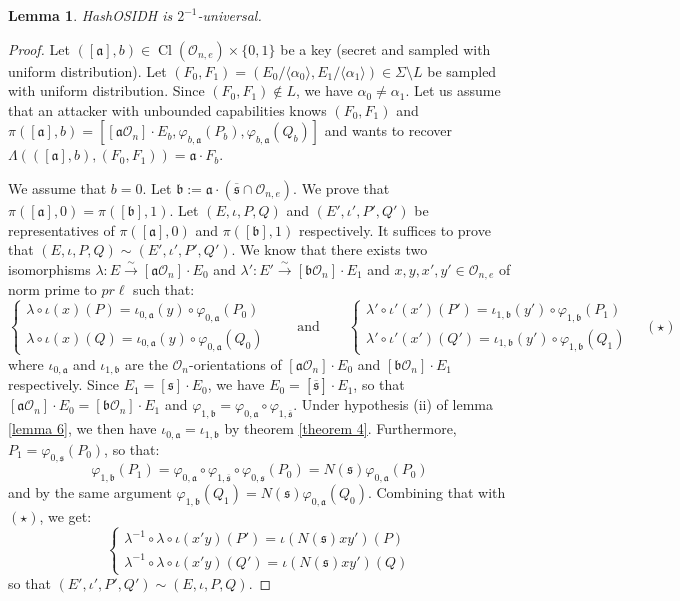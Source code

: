 \documentclass[a4paper,10pt]{report}
\theoremstyle{definition}
\theoremstyle{plain}
\newtheorem{lemma}[definition]{Lemma}
\theoremstyle{definition}
\newcommand{\mO}{\mathcal{O}}
\renewcommand{\(}{\left(}
\renewcommand{\)}{\right)}
\newcommand{\mf}[1]{\mathfrak{#1}}
\DeclareMathOperator{\Cl}{Cl}
\begin{document}
\begin{lemma}
HashOSIDH is $2^{-1}$-universal.
\end{lemma}

\begin{proof}
Let $([\mf{a}],b)\in \Cl(\mO_{n,e})\times\{0,1\}$ be a key (secret and sampled with uniform distribution). Let $(F_0,F_1)=(E_0/\langle\alpha_0\rangle, E_1/\langle\alpha_1\rangle)\in \Sigma\setminus L$ be sampled with uniform distribution.  Since $(F_0,F_1)\not\in L$, we have $\alpha_0\neq\alpha_1$. Let us assume that an attacker with unbounded capabilities knows $(F_0,F_1)$ and $\pi([\mf{a}],b)=[[\mf{a}\mO_n]\cdot E_b, \varphi_{b,\mf{a}}(P_b),\varphi_{b,\mf{a}}(Q_b)]$ and wants to recover $\Lambda(([\mf{a}],b),(F_0,F_1))=\mf{a}\cdot F_b$.  

We assume that $b=0$. Let $\mf{b}:=\mf{a}\cdot (\overline{\mf{s}}\cap\mO_{n,e})$. We prove that $\pi([\mf{a}],0)=\pi([\mf{b}],1)$. Let $(E,\iota, P,Q)$ and $(E',\iota',P',Q')$ be representatives of $\pi([\mf{a}],0)$ and $\pi([\mf{b}],1)$ respectively. It suffices to prove that $(E,\iota, P,Q)\sim(E',\iota',P',Q')$.  We know that there exists two isomorphisms $\lambda : E\overset{\sim}{\longrightarrow} [\mf{a}\mO_n]\cdot E_0$ and $\lambda' : E'\overset{\sim}{\longrightarrow} [\mf{b}\mO_n]\cdot E_1$ and $x, y, x',y'\in\mO_{n,e}$ of norm prime to $pr\ell$ such that:
\[\left\{\begin{array}{c}
\lambda\circ\iota(x)(P)=\iota_{0,\mf{a}}(y)\circ\varphi_{0,\mf{a}}(P_0)\\
\lambda\circ\iota(x)(Q)=\iota_{0,\mf{a}}(y)\circ\varphi_{0,\mf{a}}(Q_0)
\end{array}\right.\qquad \mbox{and}\qquad \left\{\begin{array}{c}
\lambda'\circ\iota'(x')(P')=\iota_{1,\mf{b}}(y')\circ\varphi_{1,\mf{b}}(P_1)\\
\lambda'\circ\iota'(x')(Q')=\iota_{1,\mf{b}}(y')\circ\varphi_{1,\mf{b}}(Q_1)
\end{array}\right.\quad (\star)\]
where $\iota_{0,\mf{a}}$ and $\iota_{1,\mf{b}}$ are the $\mO_n$-orientations of $[\mf{a}\mO_n]\cdot E_0$ and $[\mf{b}\mO_n]\cdot E_1$ respectively. Since $E_1=[\mf{s}]\cdot E_0$, we have $E_0=[\overline{\mf{s}}]\cdot E_1$, so that $[\mf{a}\mO_n]\cdot E_0=[\mf{b}\mO_n]\cdot E_1$ and $\varphi_{1,\mf{b}}=\varphi_{0,\mf{a}}\circ\varphi_{1,\overline{\mf{s}}}$.  Under hypothesis (ii) of lemma \ref{lemma 6}, we then have $\iota_{0,\mf{a}}=\iota_{1,\mf{b}}$ by theorem \ref{theorem 4}.  Furthermore, $P_1=\varphi_{0,\mf{s}}(P_0)$, so that:
\[\varphi_{1,\mf{b}}(P_1)=\varphi_{0,\mf{a}}\circ\varphi_{1,\overline{\mf{s}}}\circ\varphi_{0,\mf{s}}(P_0)=N(\mf{s})\varphi_{0,\mf{a}}(P_0)\]
and by the same argument $\varphi_{1,\mf{b}}(Q_1)=N(\mf{s})\varphi_{0,\mf{a}}(Q_0)$.  Combining that with $(\star)$, we get:
\[\left\{\begin{array}{c}
\lambda^{-1}\circ\lambda\circ\iota(x'y)(P')=\iota(N(\mf{s})xy')(P)\\
\lambda^{-1}\circ\lambda\circ\iota(x'y)(Q')=\iota(N(\mf{s})xy')(Q)
\end{array}\right.\]
so that $(E',\iota',P',Q')\sim (E,\iota, P,Q)$.


\end{proof}
\end{document}
